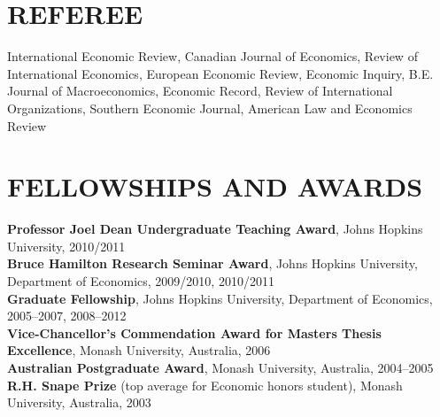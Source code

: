 \documentclass[11pt]{res}
\begin{document}
\begin{resume}
\section{REFEREE} \vspace{3mm}

International Economic Review, Canadian Journal of Economics, Review of International Economics, European Economic Review, Economic Inquiry, B.E. Journal of Macroeconomics, Economic Record, Review of International Organizations, Southern Economic Journal, American Law and Economics Review\\

\section{FELLOWSHIPS AND AWARDS}\vspace{2mm}
{\bf Professor Joel Dean Undergraduate Teaching Award}, Johns Hopkins University, 2010/2011\vspace{1.5mm}\\
{\bf Bruce Hamilton Research Seminar Award}, Johns Hopkins University, Department of Economics, 2009/2010, 2010/2011\vspace{1.5mm}\\
{\bf Graduate Fellowship}, Johns Hopkins University, Department of Economics, 2005--2007, 2008--2012\vspace{1.5mm}\\
{\bf Vice-Chancellor's Commendation Award for Masters Thesis Excellence}, Monash University, Australia, 2006\vspace{1.5mm}\\
{\bf Australian Postgraduate Award}, Monash University, Australia, 2004--2005\vspace{1.5mm}\\
{\bf R.H. Snape Prize} (top average for Economic honors student), Monash University, Australia, 2003 \\

\end{resume}
\end{document}
